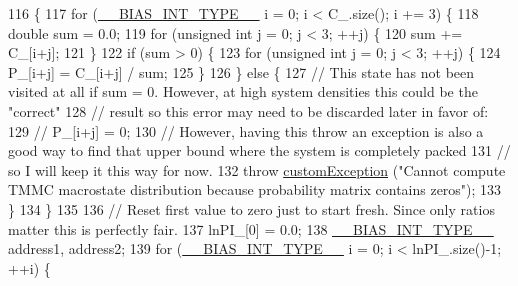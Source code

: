 \begin{DoxyCode}
116                         \{
117                 \textcolor{keywordflow}{for} (\hyperlink{bias_8h_a1ceb524363fcb94da0c64d297ea27438}{\_\_BIAS\_INT\_TYPE\_\_} i = 0; i < C\_.size(); i += 3) \{
118                                 \textcolor{keywordtype}{double} sum = 0.0;
119                                 \textcolor{keywordflow}{for} (\textcolor{keywordtype}{unsigned} \textcolor{keywordtype}{int} j = 0; j < 3; ++j) \{
120                                                 sum += C\_[i+j];
121                                 \}
122                                 \textcolor{keywordflow}{if} (sum > 0) \{
123                                                 \textcolor{keywordflow}{for} (\textcolor{keywordtype}{unsigned} \textcolor{keywordtype}{int} j = 0; j < 3; ++j) \{
124                                                                 P\_[i+j] = C\_[i+j] / sum;
125                                                 \}
126                                 \} \textcolor{keywordflow}{else} \{
127                                                 \textcolor{comment}{// This state has not been visited at all if sum = 0. 
       However, at high system densities this could be the "correct"}
128                                                 \textcolor{comment}{// result so this error may need to be discarded later in
       favor of:}
129                                                 \textcolor{comment}{// P\_[i+j] = 0;}
130                                                 \textcolor{comment}{// However, having this throw an exception is also a good
       way to find that upper bound where the system is completely packed}
131                                                 \textcolor{comment}{// so I will keep it this way for now.}
132                                                 \textcolor{keywordflow}{throw} \hyperlink{classcustom_exception}{customException} (\textcolor{stringliteral}{"Cannot compute TMMC
       macrostate distribution because probability matrix contains zeros"});
133                                 \}
134                 \}
135                 
136                 \textcolor{comment}{// Reset first value to zero just to start fresh. Since only ratios matter this is
       perfectly fair.}
137                 lnPI\_[0] = 0.0;
138                 \hyperlink{bias_8h_a1ceb524363fcb94da0c64d297ea27438}{\_\_BIAS\_INT\_TYPE\_\_} address1, address2;
139                 \textcolor{keywordflow}{for} (\hyperlink{bias_8h_a1ceb524363fcb94da0c64d297ea27438}{\_\_BIAS\_INT\_TYPE\_\_} i = 0; i < lnPI\_.size()-1; ++i) \{

\end{DoxyCode}
